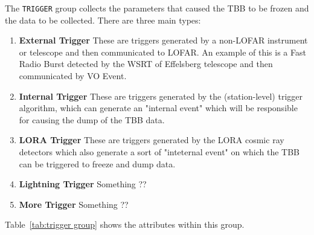 \documentclass[a4paper,10pt,bibtotoc]{scrartcl}
\begin{document}
\label{sec:trigger group}

The \verb|TRIGGER| group collects the parameters that caused the TBB to be frozen and the data to be collected. There are three main types:

\begin{enumerate}
\item \textbf{External Trigger} These are triggers generated by a non-LOFAR instrument or telescope and then communicated to LOFAR. An example of this is a Fast Radio Burst detected by the WSRT of Effelsberg telescope and then communicated by VO Event.
\item \textbf{Internal Trigger} These are triggers generated by the (station-level) trigger algorithm,
 which can generate an "internal event" which will be responsible
for causing the dump of the TBB data.
\item \textbf{LORA Trigger} These are triggers generated by the LORA cosmic ray detectors which also generate a sort of 
"inteternal event" on which the TBB can be triggered to freeze and dump data.
\item \textbf{Lightning Trigger} Something ??
\item \textbf{More Trigger} Something ??
\end{enumerate}
Table~\ref{tab:trigger group} shows the attributes within this group.


\clearpage %
\end{document}
